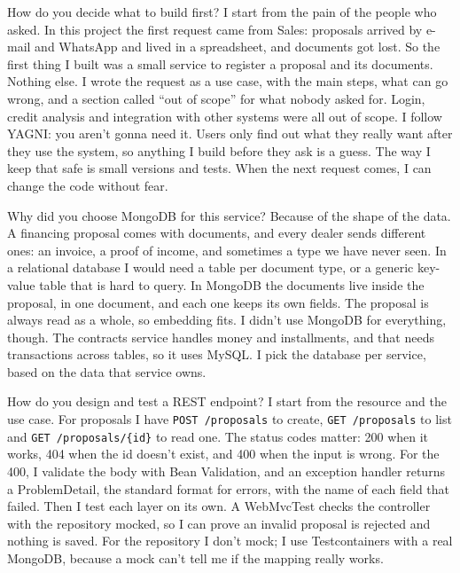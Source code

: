 \begin{interview}{How do you decide what to build first?}
I start from the pain of the people who asked. In this project the first
request came from Sales: proposals arrived by e-mail and WhatsApp and lived in
a spreadsheet, and documents got lost. So the first thing I built was a small
service to register a proposal and its documents. Nothing else. I wrote the
request as a use case, with the main steps, what can go wrong, and a section
called ``out of scope'' for what nobody asked for. Login, credit analysis and
integration with other systems were all out of scope. I follow YAGNI: you
aren't gonna need it. Users only find out what they really want after they
use the system, so anything I build before they ask is a guess. The way I keep
that safe is small versions and tests. When the next request comes, I can
change the code without fear.
\end{interview}

\begin{interview}{Why did you choose MongoDB for this service?}
Because of the shape of the data. A financing proposal comes with documents,
and every dealer sends different ones: an invoice, a proof of income, and
sometimes a type we have never seen. In a relational database I would need a
table per document type, or a generic key-value table that is hard to query.
In MongoDB the documents live inside the proposal, in one document, and each
one keeps its own fields. The proposal is always read as a whole, so
embedding fits. I didn't use MongoDB for everything, though. The contracts
service handles money and installments, and that needs transactions across
tables, so it uses MySQL. I pick the database per service, based on the data
that service owns.
\end{interview}

\begin{interview}{How do you design and test a REST endpoint?}
I start from the resource and the use case. For proposals I have
\texttt{POST /proposals} to create, \texttt{GET /proposals} to list and
\texttt{GET /proposals/\{id\}} to read one. The status codes matter: 200 when
it works, 404 when the id doesn't exist, and 400 when the input is wrong. For
the 400, I validate the body with Bean Validation, and an exception handler
returns a ProblemDetail, the standard format for errors, with the name of
each field that failed. Then I test each layer on its own. A WebMvcTest
checks the controller with the repository mocked, so I can prove an invalid
proposal is rejected and nothing is saved. For the repository I don't mock;
I use Testcontainers with a real MongoDB, because a mock can't tell me if the
mapping really works.
\end{interview}
